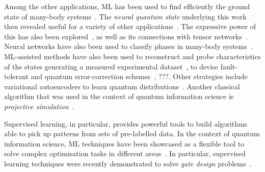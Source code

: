 Among the other applications, \ac{ML} has been used to find efficiently the ground state of many-body systems~\cite{carleo2017solving}. The \emph{neural quantum state} \ansatz underlying this work then revealed useful for a variety of other applications~\cite{torlai2017neural,torlai2017manybody,choo2018symmetries,saito2018method,torlai2018neuralnetwork,torlai2018latent,sharir2019deep,jia2019quantum,levine2019quantum,hartmann2019neuralnetwork,vicentini2019variational,torlai2019integrating,liu2019machine,harney2019entanglement,cui2019directions,carleo2019machine}. The expressive power of this \ansatz has also been explored~\cite{deng2017quantum,gao2017efficient}, as well as its connections with tensor networks~\cite{glasser2018neuralnetwork}.
Neural networks have also been used to classify phases in many-body systems~\cite{wang2016discovering,carrasquilla2017machine,van2017learning,deng2017machine,kaubruegger2018chiral,carleo2019machine}.
ML-assisted methods have also been used to reconstruct and probe characteristics of the states generating a measured experimental dataset~\cite{fujita2018construction,gray2018machinelearningassisted,havlíček2019supervised,canabarro2019machine,agresti2019pattern}, to devise fault-tolerant and quantum error-correction schemes~\cite{liu2019neural}, ???.
Other strategies include variational autoencoders to learn quantum distributions~\cite{rocchetto2018learning}.
Another classical algorithm that was used in the context of quantum information science is \emph{projective simulation}~\cite{melnikov2014projective,makmal2016metalearning,melnikov2017projective,melnikov2018benchmarking,melnikov2018active,wallnöfer2019machine,flamini2019photonic}.


Supervised learning, in particular, provides powerful tools to build algorithms able to pick up patterns from sets of pre-labelled data.
In the context of quantum information science, \ac{ML} techniques have been showcased as a flexible tool to solve complex optimisation tasks in different areas~\cite{zdeborov2017machine,carrasquilla2017machine,carleo2017solving,van2017learning,schoenholz2016structural,torlai2017manybody,rocchetto2019experimental,melnikov2018active,banchi2016quantum,fujita2018construction,innocenti2018supervised}.
In particular, supervised learning techniques were recently demonstrated to solve \emph{gate design} problems~\cite{banchi2016quantum,innocenti2018supervised,innocenti2018approximate}.


